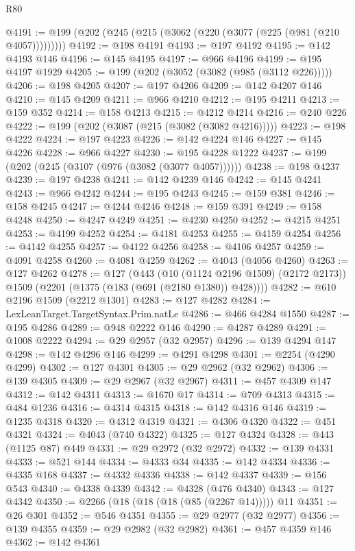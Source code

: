 \begin{lexlean}{R80}
\begin{coremodule}
@4191 := @199 (@202 (@245 (@215 (@3062 (@220 (@3077 (@225 (@981 (@210 @4057)))))))))
@4192 := @198 @4191
@4193 := @197 @4192
@4195 := @142 @4193 @146
@4196 := @145 @4195
@4197 := @966 @4196
@4199 := @195 @4197 @1929
@4205 := @199 (@202 (@3052 (@3082 (@985 (@3112 @226)))))
@4206 := @198 @4205
@4207 := @197 @4206
@4209 := @142 @4207 @146
@4210 := @145 @4209
@4211 := @966 @4210
@4212 := @195 @4211
@4213 := @159 @352
@4214 := @158 @4213
@4215 := @4212 @4214
@4216 := @240 @226
@4222 := @199 (@202 (@3087 (@215 (@3082 (@3082 @4216)))))
@4223 := @198 @4222
@4224 := @197 @4223
@4226 := @142 @4224 @146
@4227 := @145 @4226
@4228 := @966 @4227
@4230 := @195 @4228 @1222
@4237 := @199 (@202 (@245 (@3107 (@976 (@3082 (@3077 @4057))))))
@4238 := @198 @4237
@4239 := @197 @4238
@4241 := @142 @4239 @146
@4242 := @145 @4241
@4243 := @966 @4242
@4244 := @195 @4243
@4245 := @159 @381
@4246 := @158 @4245
@4247 := @4244 @4246
@4248 := @159 @391
@4249 := @158 @4248
@4250 := @4247 @4249
@4251 := @4230 @4250
@4252 := @4215 @4251
@4253 := @4199 @4252
@4254 := @4181 @4253
@4255 := @4159 @4254
@4256 := @4142 @4255
@4257 := @4122 @4256
@4258 := @4106 @4257
@4259 := @4091 @4258
@4260 := @4081 @4259
@4262 := @4043 (@4056 @4260)
@4263 := @127 @4262
@4278 := @127
    (@443
      (@10 (@1124 @2196 @1509) (@2172 @2173))
      @1509
      (@2201 (@1375 (@183 (@691 (@2180 @1380)) @428))))
@4282 := @610 @2196 @1509 (@2212 @1301)
@4283 := @127 @4282
@4284 := LexLeanTarget.TargetSyntax.Prim.natLe
@4286 := @466 @4284 @1550
@4287 := @195 @4286
@4289 := @948 @2222 @146
@4290 := @4287 @4289
@4291 := @1008 @2222
@4294 := @29 @2957 (@32 @2957)
@4296 := @139 @4294 @147
@4298 := @142 @4296 @146
@4299 := @4291 @4298
@4301 := @2254 (@4290 @4299)
@4302 := @127 @4301
@4305 := @29 @2962 (@32 @2962)
@4306 := @139 @4305
@4309 := @29 @2967 (@32 @2967)
@4311 := @457 @4309 @147
@4312 := @142 @4311
@4313 := @1670 @17
@4314 := @709 @4313
@4315 := @484 @1236
@4316 := @4314 @4315
@4318 := @142 @4316 @146
@4319 := @1235 @4318
@4320 := @4312 @4319
@4321 := @4306 @4320
@4322 := @451 @4321
@4324 := @4043 (@740 @4322)
@4325 := @127 @4324
@4328 := @443 (@1125 @87) @449
@4331 := @29 @2972 (@32 @2972)
@4332 := @139 @4331
@4333 := @521 @144
@4334 := @4333 @34
@4335 := @142 @4334
@4336 := @4335 @168
@4337 := @4332 @4336
@4338 := @142 @4337
@4339 := @156 @543
@4340 := @4338 @4339
@4342 := @4328 (@476 @4340)
@4343 := @127 @4342
@4350 := @2266 (@18 (@18 (@18 (@85 (@2267 @14))))) @11
@4351 := @26 @301
@4352 := @546 @4351
@4355 := @29 @2977 (@32 @2977)
@4356 := @139 @4355
@4359 := @29 @2982 (@32 @2982)
@4361 := @457 @4359 @146
@4362 := @142 @4361

\end{coremodule}
\end{lexlean}
